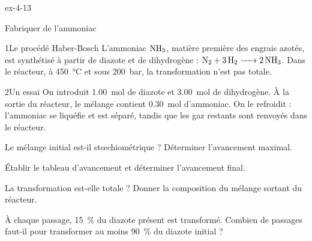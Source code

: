 \begin{blocLivre}{ex-4-13}
\begin{exercice}[3]{Fabriquer de l'ammoniac}
\begin{docu}{1}{Le procédé Haber-Bosch}
L'ammoniac $\ce{NH3}$, matière première des engrais azotés, est synthétisé à partir de diazote et de dihydrogène :
$\ce{N2 + 3H2 -> 2NH3}$. Dans le réacteur, à \qty{450}{\degreeCelsius} et sous \qty{200}{bar}, la transformation n'est pas totale.
\end{docu}
\begin{docu}{2}{Un essai}
On introduit \qty{1,00}{mol} de diazote et \qty{3,00}{mol} de dihydrogène. À la sortie du réacteur, le mélange contient \qty{0,30}{mol}
d'ammoniac. On le refroidit : l'ammoniac se liquéfie et est séparé, tandis que les gaz restants sont renvoyés dans le
réacteur.
\end{docu}
\begin{questions}
\item Le mélange initial est-il stœchiométrique ? Déterminer l'avancement maximal.
\item Établir le tableau d'avancement et déterminer l'avancement final.
\item La transformation est-elle totale ? Donner la composition du mélange sortant du réacteur.
\item \initiative À chaque passage, \qty{15}{\percent} du diazote présent est transformé. Combien de passages faut-il pour transformer au
moins \qty{90}{\percent} du diazote initial ?
\end{questions}
\end{exercice}
\end{blocLivre}
